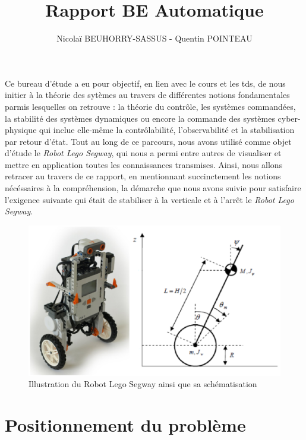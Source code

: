 \documentclass[a4paper]{article}
\title{Rapport BE Automatique}
\author{Nicolaï BEUHORRY-SASSUS - Quentin POINTEAU}
\date{}
\begin{document}
        \maketitle
        \tableofcontents
        \listoffigures
        \listoftables
        \vspace{20pt}

        \hspace{25pt} Ce bureau d'étude a eu pour objectif, en lien avec le cours et les tds, de nous initier à la théorie des sytèmes 
        au travers de différentes notions fondamentales parmis lesquelles on retrouve : la théorie du contrôle, les systèmes 
        commandées, la stabilité des systèmes dynamiques ou encore la commande des systèmes cyber-physique qui inclue elle-même 
        la contrôlabilité, l'observabilité et la stabilisation par retour d'état. Tout au long de ce parcours, nous avons 
        utilisé comme objet d'étude le \textit{Robot Lego Segway}, qui nous a permi entre autres de visualiser et mettre en 
        application toutes les connaissances transmises. Ainsi, nous allons retracer au travers de ce rapport, en mentionnant 
        succinctement les notions nécéssaires à la compréhension, la démarche que nous avons suivie pour satisfaire l'exigence 
        suivante qui était de stabiliser à la verticale et à l'arrêt le \textit{Robot Lego Segway}.

        \begin{figure}[h!]
                \centering
                \includegraphics[scale=0.25]{images/robot_lego.png}
                \caption{Illustration du Robot Lego Segway ainsi que sa schématisation}
                \label{fig_robot_lego}
        \end{figure}


        \section{Positionnement du problème}
\end{document}
